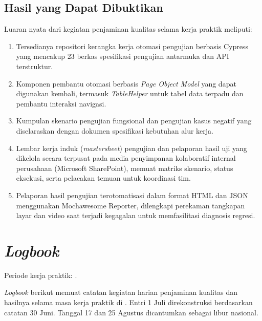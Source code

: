 \subsection*{Hasil yang Dapat Dibuktikan}
Luaran nyata dari kegiatan penjaminan kualitas selama kerja praktik meliputi:
\begin{enumerate}[label=\arabic*)]
\item Tersedianya repositori kerangka kerja otomasi pengujian berbasis Cypress yang mencakup 23 berkas spesifikasi pengujian antarmuka dan API terstruktur.
\item Komponen pembantu otomasi berbasis \textit{Page Object Model} yang dapat digunakan kembali, termasuk \textit{TableHelper} untuk tabel data terpadu dan pembantu interaksi navigasi.
\item Kumpulan skenario pengujian fungsional dan pengujian kasus negatif yang diselaraskan dengan dokumen spesifikasi kebutuhan alur kerja.
\item Lembar kerja induk (\textit{mastersheet}) pengujian dan pelaporan hasil uji yang dikelola secara terpusat pada media penyimpanan kolaboratif internal perusahaan (Microsoft SharePoint), memuat matriks skenario, status eksekusi, serta pelacakan temuan untuk koordinasi tim.
\item Pelaporan hasil pengujian terotomatisasi dalam format HTML dan JSON menggunakan Mochawesome Reporter, dilengkapi perekaman tangkapan layar dan video saat terjadi kegagalan untuk memfasilitasi diagnosis regresi.
\end{enumerate}

\section{\textit{Logbook}}\label{sec:logbook-frederiko}
Periode kerja praktik: \PeriodeKP.

\textit{Logbook} berikut memuat catatan kegiatan harian penjaminan kualitas dan hasilnya selama masa kerja praktik di \TempatKP. Entri 1 Juli direkonstruksi berdasarkan catatan 30 Juni. Tanggal 17 dan 25 Agustus dicantumkan sebagai libur nasional.

